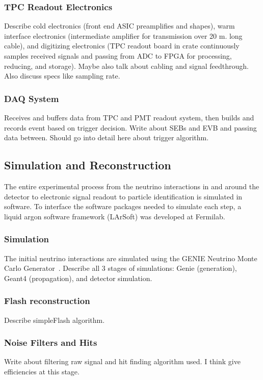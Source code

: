   \subsubsection{TPC Readout Electronics}
    Describe cold electronics (front end ASIC preamplifies and shapes), warm
    interface electronics (intermediate amplifier for transmission over 20 m.
    long cable), and digitizing electronics (TPC readout board in crate
    continuously samples received signals and passing from ADC to FPGA for
    processing, reducing, and storage). Maybe also talk about cabling and
    signal feedthrough. Also discuss specs like sampling rate.
  \subsubsection{DAQ System}
    Receives and buffers data from TPC and PMT readout system, then builds and
    records event based on trigger decision. Write about SEBs and EVB and
    passing data between. Should go into detail here about trigger algorithm.

\subsection{Simulation and Reconstruction}\label{reco}
  The entire experimental process from the neutrino interactions in and around
  the detector to electronic signal readout to particle identification is
  simulated in software. To interface the software packages needed to simulate
  each step, a liquid argon software framework (LArSoft) was developed at
  Fermilab.
  \subsubsection{Simulation}
    The initial neutrino interactions are simulated using the GENIE Neutrino
    Monte Carlo Generator~\cite{Andreopoulos:2009rq,Andreopoulos:2015wxa}.
    Describe all 3 stages of simulations: Genie (generation), Geant4
    (propagation), and detector simulation.
  \subsubsection{Flash reconstruction}
    Describe simpleFlash algorithm.
  \subsubsection{Noise Filters and Hits}
    Write about filtering raw signal and hit finding algorithm used.
    I think give efficiencies at this stage.
